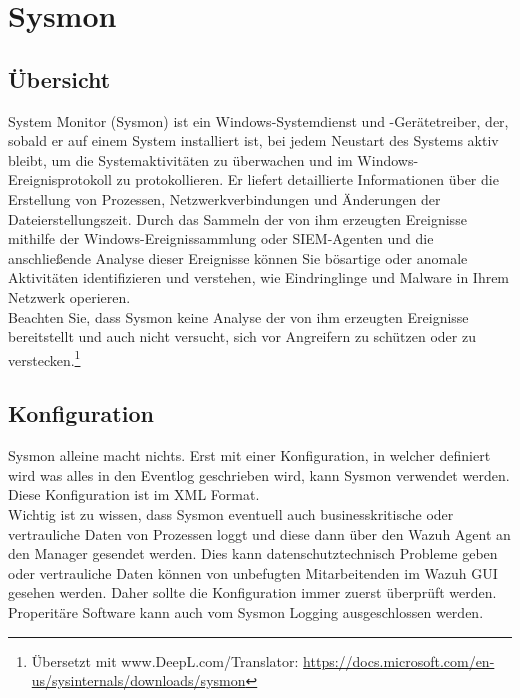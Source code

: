 \chapter{Sysmon}
\section{Übersicht}
System Monitor (Sysmon) ist ein Windows-Systemdienst und -Gerätetreiber, der, sobald er auf einem System installiert ist, bei jedem Neustart des Systems aktiv bleibt, um die Systemaktivitäten zu überwachen und im Windows-Ereignisprotokoll zu protokollieren. Er liefert detaillierte Informationen über die Erstellung von Prozessen, Netzwerkverbindungen und Änderungen der Dateierstellungszeit. Durch das Sammeln der von ihm erzeugten Ereignisse mithilfe der Windows-Ereignissammlung oder SIEM-Agenten und die anschließende Analyse dieser Ereignisse können Sie bösartige oder anomale Aktivitäten identifizieren und verstehen, wie Eindringlinge und Malware in Ihrem Netzwerk operieren.\\

Beachten Sie, dass Sysmon keine Analyse der von ihm erzeugten Ereignisse bereitstellt und auch nicht versucht, sich vor Angreifern zu schützen oder zu verstecken.\footnote{Übersetzt mit www.DeepL.com/Translator: \href{https://docs.microsoft.com/en-us/sysinternals/downloads/sysmon}{https://docs.microsoft.com/en-us/sysinternals/downloads/sysmon}}

\section{Konfiguration}
Sysmon alleine macht nichts. 
Erst mit einer Konfiguration, in welcher definiert wird was alles in den Eventlog geschrieben wird, kann Sysmon verwendet werden.
Diese Konfiguration ist im XML Format. \\

Wichtig ist zu wissen, dass Sysmon eventuell auch businesskritische oder vertrauliche Daten von Prozessen loggt und diese dann über den Wazuh Agent an den Manager gesendet werden.
Dies kann datenschutztechnisch Probleme geben oder vertrauliche Daten können von unbefugten Mitarbeitenden im Wazuh GUI gesehen werden.
Daher sollte die Konfiguration immer zuerst überprüft werden.
Properitäre Software kann auch vom Sysmon Logging ausgeschlossen werden.
